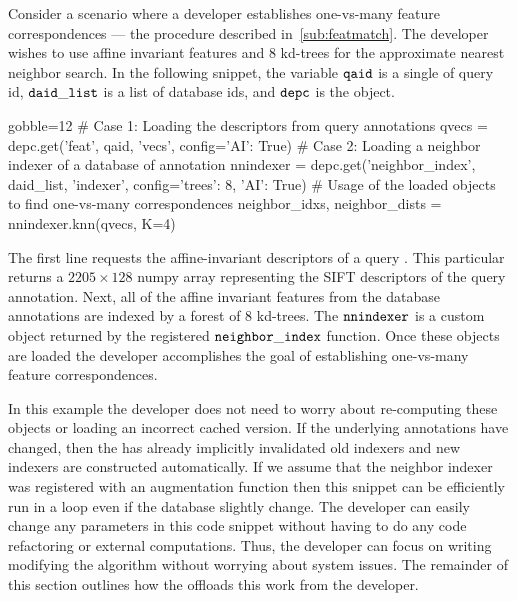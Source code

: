         Consider a scenario where a developer establishes one-vs-many feature
          correspondences --- the procedure described in~\cref{sub:featmatch}.
        The developer wishes to use affine invariant features and $8$ kd-trees
          for the approximate nearest neighbor search.
        In the following snippet, the variable $\tt{qaid}$ is a single of
          query \annot{} id, $\tt{daid\_list}$ is a list of database \annot{}
          ids, and $\tt{depc}$ is the \depcache{} object.
            \begin{comment}
        python << endpython
        import ibeis
        ibs = ibeis.opendb('testdb1')
        depc = ibs.depc
        qaid = 1
        daid_list = [2, 3, 4]
        #<NNIndexer at 0x7fb7efbb0340>
        #[array([[..., 
        #        [ 2,  1,  4, ...,  3,  1,  0]], dtype=uint8)]
        endpython
        \end{comment}
        \begin{pythoncode*}{gobble=12}
            # Case 1: Loading the descriptors from query annotations
            qvecs = depc.get('feat', qaid, 'vecs', config={'AI': True})
            # Case 2: Loading a neighbor indexer of a database of annotation
            nnindexer = depc.get('neighbor_index', daid_list, 'indexer', config={'trees': 8, 'AI': True})
            # Usage of the loaded objects to find one-vs-many correspondences
            neighbor_idxs, neighbor_dists = nnindexer.knn(qvecs, K=4)
        \end{pythoncode*}
        The first line requests the affine-invariant descriptors of a query
          \annot{}.
        This particular \annot{} returns a $2205 \times 128$ numpy array
          representing the SIFT descriptors of the query annotation.
        Next, all of the affine invariant features from the database
          annotations are indexed by a forest of $8$ kd-trees.
        The $\tt{nnindexer}$ is a custom object returned by the registered
          $\tt{neighbor\_index}$ function.
        Once these objects are loaded the developer accomplishes the goal of
          establishing one-vs-many feature correspondences.

        In this example the developer does not need to worry about
          re-computing these objects or loading an incorrect cached version.
        If the underlying annotations have changed, then the \depcache{} has
          already implicitly invalidated old indexers and new indexers are
          constructed automatically.
        If we assume that the neighbor indexer was registered with an
          augmentation function then this snippet can be efficiently run in a
          loop even if the database \annots{} slightly change.
        The developer can easily change any parameters in this code snippet
          without having to do any code refactoring or external computations.
        Thus, the developer can focus on writing modifying the algorithm
          without worrying about system issues.
        The remainder of this section outlines how the \depcache{} offloads
          this work from the developer.

